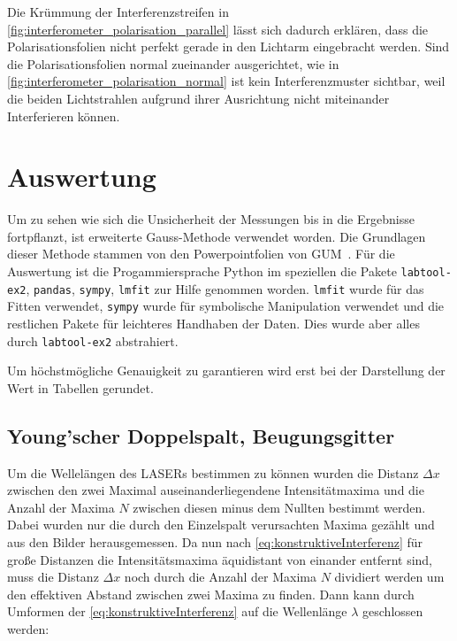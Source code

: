\documentclass[12pt,english,ngerman]{scrartcl}
\begin{document}
Die Krümmung der Interferenzstreifen in
\autoref{fig:interferometer_polarisation_parallel} lässt sich dadurch erklären,
dass die Polarisationsfolien nicht perfekt gerade in den Lichtarm eingebracht
werden. Sind die Polarisationsfolien normal zueinander ausgerichtet, wie in
\autoref{fig:interferometer_polarisation_normal} ist kein Interferenzmuster
sichtbar, weil die beiden Lichtstrahlen aufgrund ihrer Ausrichtung nicht
miteinander Interferieren können.

\section{Auswertung}\label{sec:auswertung}

Um zu sehen wie sich die Unsicherheit der Messungen bis in die Ergebnisse
fortpflanzt, ist erweiterte Gauss-Methode verwendet worden. Die Grundlagen
dieser Methode stammen von den Powerpointfolien von
GUM~\cite{wolfgangkesselISOBIPMGUMSicht2004}. Für die Auswertung ist die
Progammiersprache Python im speziellen die Pakete \verb#labtool-ex2#,
\verb#pandas#, \verb#sympy#, \verb#lmfit# zur Hilfe genommen worden.
\verb#lmfit# wurde für das Fitten verwendet, \verb#sympy# wurde für symbolische
Manipulation verwendet und die restlichen Pakete für leichteres Handhaben der
Daten. Dies wurde aber alles durch \verb#labtool-ex2# abstrahiert.

Um höchstmögliche Genauigkeit zu garantieren wird erst bei der Darstellung der
Wert in Tabellen gerundet.

\subsection{Young'scher Doppelspalt, Beugungsgitter}\label{sec:ausw_doppelt}

Um die Wellelängen des LASERs bestimmen zu können wurden die Distanz
$\Delta x$ zwischen den zwei Maximal auseinanderliegendene Intensitätmaxima und
die Anzahl der Maxima $N$ zwischen diesen minus dem Nullten bestimmt werden.
Dabei wurden nur die durch den Einzelspalt verursachten Maxima gezählt und
aus den Bilder herausgemessen. Da nun nach
\autoref{eq:konstruktiveInterferenz} für große Distanzen die Intensitätsmaxima
äquidistant von einander entfernt sind, muss die Distanz $\Delta x$ noch durch
die Anzahl der Maxima $N$ dividiert werden um den effektiven Abstand zwischen zwei Maxima zu
finden. Dann kann durch Umformen der \autoref{eq:konstruktiveInterferenz}
auf die Wellenlänge $\lambda$ geschlossen werden:
\end{document}
